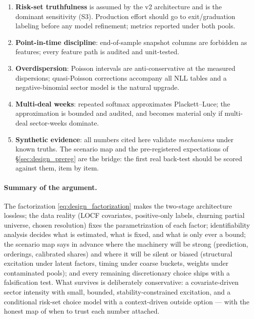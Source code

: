 \begin{enumerate}[leftmargin=1.6em]
\item \textbf{Risk-set truthfulness} is assumed by the v2 architecture and is
the dominant sensitivity (S3). Production effort should go to exit/graduation
labeling before any model refinement; metrics reported under both pools.
\item \textbf{Point-in-time discipline}: end-of-sample snapshot columns are
forbidden as features; every feature path is audited and unit-tested.
\item \textbf{Overdispersion}: Poisson intervals are anti-conservative at the
measured dispersions; quasi-Poisson corrections accompany all NLL tables and a
negative-binomial sector model is the natural upgrade.
\item \textbf{Multi-deal weeks}: repeated softmax approximates Plackett--Luce;
the approximation is bounded and audited, and becomes material only if
multi-deal sector-weeks dominate.
\item \textbf{Synthetic evidence}: all numbers cited here validate
\emph{mechanisms} under known truths. The scenario map and the pre-registered
expectations of \S\ref{sec:design_prereg} are the bridge: the first real
back-test should be scored against them, item by item.
\end{enumerate}

\paragraph{Summary of the argument.} The factorization
\eqref{eq:design_factorization} makes the two-stage architecture lossless; the
data reality (LOCF covariates, positive-only labels, churning partial universe,
chosen resolution) fixes the parametrization of each factor; identifiability
analysis decides what is estimated, what is fixed, and what is only ever a
bound; the scenario map says in advance where the machinery will be strong
(prediction, orderings, calibrated shares) and where it will be silent or
biased (structural excitation under latent factors, timing under coarse
buckets, weights under contaminated pools); and every remaining discretionary
choice ships with a falsification test. What survives is deliberately
conservative: a covariate-driven sector intensity with small, bounded,
stability-constrained excitation, and a conditional risk-set choice model with
a context-driven outside option --- with the honest map of when to trust each
number attached.
